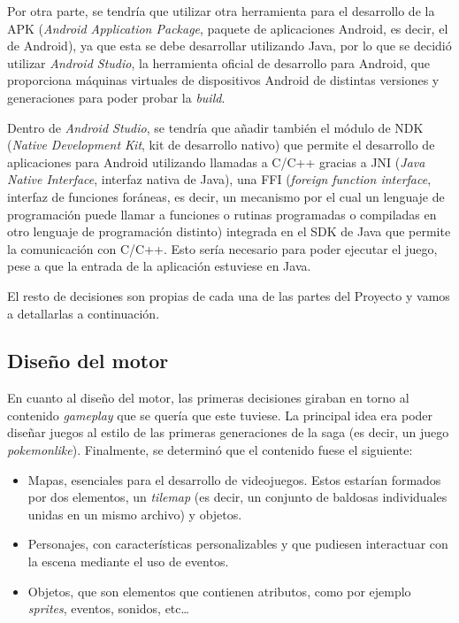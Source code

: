 \medskip

Por otra parte, se tendría que utilizar otra herramienta para el desarrollo de la APK (\textit{Android Application Package}, paquete de aplicaciones Android, es decir, el  de Android), ya que esta se debe desarrollar utilizando Java, por lo que se decidió utilizar \textit{Android Studio}, la herramienta oficial de desarrollo para Android, que proporciona máquinas virtuales de dispositivos Android de distintas versiones y generaciones para poder probar la \textit{build}.

\smallskip

Dentro de \textit{Android Studio}, se tendría que añadir también el módulo de NDK (\textit{Native Development Kit}, kit de desarrollo nativo) que permite el desarrollo de aplicaciones para Android utilizando llamadas a C/C++ gracias a JNI (\textit{Java Native Interface}, interfaz nativa de Java), una FFI (\textit{foreign function interface}, interfaz de funciones foráneas, es decir, un mecanismo por el cual un lenguaje de programación puede llamar a funciones o rutinas programadas o compiladas en otro lenguaje de programación distinto) integrada en el SDK de Java que permite la comunicación con C/C++. Esto sería necesario para poder ejecutar el juego, pese a que la entrada de la aplicación estuviese en Java.

\medskip

El resto de decisiones son propias de cada una de las partes del Proyecto y vamos a detallarlas a continuación.

\subsection{Diseño del motor}
En cuanto al diseño del motor, las primeras decisiones giraban en torno al contenido \textit{gameplay} que se quería que este tuviese. La principal idea era poder diseñar juegos al estilo de las primeras generaciones de la saga \cite{pokemon} (es decir, un juego \textit{pokemonlike}). Finalmente, se determinó que el contenido fuese el siguiente:
\begin{itemize}
	\item Mapas, esenciales para el desarrollo de videojuegos. Estos estarían formados por dos elementos, un \textit{tilemap} (es decir, un conjunto de baldosas individuales unidas en un mismo archivo) y objetos.
	\item Personajes, con características personalizables y que pudiesen interactuar con la escena mediante el uso de eventos.
	\item Objetos, que son elementos que contienen atributos, como por ejemplo \textit{sprites}, eventos, sonidos, etc\ldots
\end{itemize}

